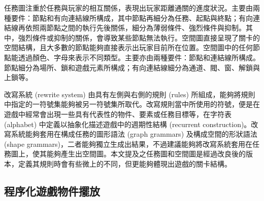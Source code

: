 任務圖注重於任務與玩家的相互關係，表現出玩家距離通關的進度狀況。主要由兩種要件：節點和有向連結線所構成，其中節點再細分為任務、起點與終點；有向連結線再依照兩節點之間的執行先後關係，細分為薄弱條件、強烈條件與抑制。其中，強烈條件或抑制的關係，會導致某些節點無法執行。空間圖直接呈現了關卡的空間結構，且大多數的節點能夠直接表示出玩家目前所在位置。空間圖中的任何節點能透過顏色、字母來表示不同類型。主要亦由兩種要件：節點和連結線所構成。節點細分為場所、鎖和遊戲元素所構成；有向連結線細分為通道、閥、窗、解鎖與上鎖等。

改寫系統 (rewrite system) 由具有左側與右側的規則 (rules) 所組成，能夠將規則中指定的一符號集能夠被另一符號集所取代。改寫規則當中所使用的符號，便是在遊戲中經常會出現一些具有代表性的物件、要素或任務目標等，在字符表 (alphabet) 中定義以抽象化描述遊戲中的週期性結構 (recurrent construction)。改寫系統能夠套用在構成任務的圖形語法 (graph grammars) 及構成空間的形狀語法 (shape grammars)，二者能夠獨立生成出結果，不過建議能夠將改寫系統套用在任務圖上，使其能夠產生出空間圖。本文提及之任務圖和空間圖是經過改良後的版本，定義其規則時會有些微上的不同，但更能夠體現出遊戲的關卡結構。





\subsection{程序化遊戲物件擺放}
\label{ssec:relatedworks-proceduralgamepatterns}

